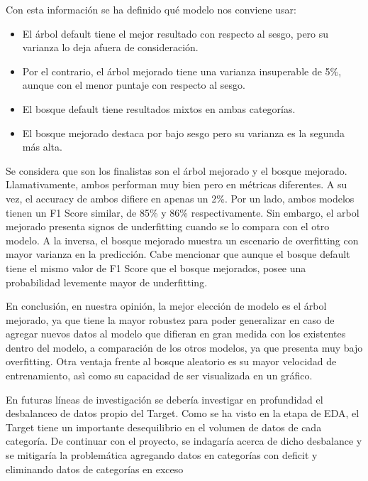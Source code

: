 \documentclass[a4paper]{article}
\begin{document}
    Con esta información se ha definido qué modelo nos conviene usar:
    \begin{itemize}
        \item El árbol default tiene el mejor resultado con respecto al sesgo, pero su varianza lo deja afuera de consideración.
        \item Por el contrario, el árbol mejorado tiene una varianza insuperable de 5\%, aunque con el menor puntaje con respecto al sesgo.
        \item El bosque default tiene resultados mixtos en ambas categorías.
        \item El bosque mejorado destaca por bajo sesgo pero su varianza es la segunda más alta.
    \end{itemize}
    
    Se considera que son los finalistas son el árbol mejorado y el bosque mejorado. Llamativamente, ambos performan muy bien pero en métricas diferentes. A su vez, el accuracy de ambos difiere en apenas un 2\%. Por un lado, ambos modelos tienen un F1 Score similar, de 85\% y 86\% respectivamente. Sin embargo, el arbol mejorado presenta signos de underfitting cuando se lo compara con el otro modelo. A la inversa, el bosque mejorado muestra un escenario de overfitting con mayor varianza en la predicción. Cabe mencionar que aunque el bosque default tiene el mismo valor de F1 Score que el bosque mejorados, posee una probabilidad levemente mayor de underfitting. 

\vspace{1cm}
    
    En conclusión, en nuestra opinión, la mejor elección de modelo es el árbol mejorado, ya que tiene la mayor robustez  para poder generalizar en caso de agregar nuevos datos al modelo que difieran en gran medida con los existentes dentro del modelo, a comparación de los otros modelos, ya que presenta muy bajo overfitting. Otra ventaja frente al bosque aleatorio es su mayor velocidad de entrenamiento, asì como su capacidad de ser visualizada en un gráfico.

\vspace{1cm}

    En futuras líneas de investigación se debería investigar en profundidad el desbalanceo de datos propio del Target. Como se ha visto en la etapa de EDA, el Target tiene un importante desequilibrio en el volumen de datos de cada categoría. De continuar con el proyecto, se indagaría acerca de dicho desbalance y se mitigaría la problemática agregando datos en categorías con deficit y eliminando datos de categorías en exceso

    
    
\end{document}
